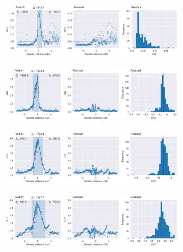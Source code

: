 \begin{refsection}
\begin{figure}[t!]
\begin{subfigure}[t]{0.32\textwidth}
    \end{subfigure}
    \begin{subfigure}[t]{0.32\textwidth}
        \centering
        \caption{}
        \includegraphics[width=1.1\textwidth,center,trim=0 27 380 0, clip]{artwork/chapter5/peak_fit_h12_cyp9k1_gns.png}
    \end{subfigure}
    \vspace{0cm}
    \begin{subfigure}[t]{0.32\textwidth}
        \centering
        \caption{}
        \includegraphics[width=1.1\textwidth,center,trim=0 0 380 0, clip]{artwork/chapter5/peak_fit_h12_vgsc_bfm.png}
    \end{subfigure}
    \hfill
    \begin{subfigure}[t]{0.32\textwidth}
        \centering
        \caption{}
        \includegraphics[width=1.1\textwidth,center,trim=0 0 380 0, clip]{artwork/chapter5/peak_fit_h12_vgsc_bfs.png}
    \end{subfigure}
    \begin{subfigure}[t]{0.32\textwidth}
        \centering
        \caption{}
        \includegraphics[width=1.1\textwidth,center,trim=0 0 380 0, clip]{artwork/chapter5/peak_fit_h12_vgsc_ugs.png}

\end{subfigure}
\end{figure}
\end{refsection}
